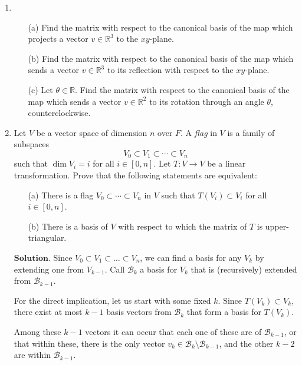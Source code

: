 \documentclass{article}
\theoremstyle{remark}
\begin{document}
\begin{enumerate}
        \item \begin{enumerate}
            \item[(a)] Find the matrix with respect to the canonical basis of the map which projects a vector \( v \in \mathbb{R}^3 \) to the \( xy \)-plane.
            \item[(b)] Find the matrix with respect to the canonical basis of the map which sends a vector \( v \in \mathbb{R}^3 \) to its reflection with respect to the \( xy \)-plane.
            \item[(c)] Let \( \theta \in \mathbb{R} \). Find the matrix with respect to the canonical basis of the map which sends a vector \( v \in \mathbb{R}^2 \) to its rotation through an angle \( \theta \), counterclockwise.
        \end{enumerate}

        \item Let \( V \) be a vector space of dimension \( n \) over \( F \). A \emph{flag} in \( V \) is a family of subspaces 
        \[
        V_0 \subset V_1 \subset \cdots \subset V_n
        \]
        such that \( \dim V_i = i \) for all \( i \in [0, n] \). Let \( T: V \to V \) be a linear transformation. Prove that the following statements are equivalent:
        \begin{enumerate}
            \item[(a)] There is a flag \( V_0 \subset \cdots \subset V_n \) in \( V \) such that \( T(V_i) \subset V_i \) for all \( i \in [0, n] \).
            \item[(b)] There is a basis of \( V \) with respect to which the matrix of \( T \) is upper-triangular.
        \end{enumerate}
        $\textbf{Solution.}$ Since $V_0 \subset V_1 \subset \dots \subset V_n$, we can find a basis for any $V_k$ by extending one from $V_{k-1}$.
        Call $\mathcal{B}_k$ a basis for $V_k$ that is (recursively) extended from $\mathcal{B}_{k-1}$.

        For the direct implication, let us start with some fixed $k$.
        Since $T(V_k) \subset V_k$, there exist at most $k-1$ basis vectors from $\mathcal{B}_k$ that form a basis for $T(V_k)$.
        
        Among these $k-1$ vectors it can occur that each one of these are of $\mathcal{B}_{k-1}$, or that 
        within these, there is the only vector $v_k \in \mathcal{B}_k \setminus \mathcal{B}_{k-1}$, and the other
        $k-2$ are within $\mathcal{B}_{k-1}$.


\end{enumerate}
\end{document}
